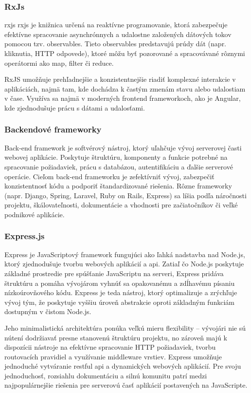 \subsubsection*{RxJs}
\acrshort{rxjs} \acrfull{rxjs} je knižnica určená na reaktívne programovanie, ktorá zabezpečuje efektívne spracovanie asynchrónnych a udalostne založených dátových tokov pomocou tzv. observables. 
Tieto observables predstavujú prúdy dát (napr. kliknutia, HTTP odpovede), ktoré môžu byť pozorované a spracovávané rôznymi operátormi ako map, filter či reduce.

RxJS umožňuje prehľadnejšie a konzistentnejšie riadiť komplexné interakcie v aplikáciách, najmä tam, kde dochádza k častým zmenám stavu alebo udalostiam v čase.
Využíva sa najmä v moderných frontend frameworkoch, ako je Angular, kde zjednodušuje prácu s dátami a udalosťami.\cite{rxjs}
\subsubsection*{Backendové frameworky}
Back-end framework je softvérový nástroj, ktorý uľahčuje vývoj serverovej časti webovej aplikácie. 
Poskytuje štruktúru, komponenty a funkcie potrebné na spracovanie požiadaviek, prácu s databázou, autentifikáciu a ďalšie serverové operácie. 
Cieľom back-end frameworku je zefektívniť vývoj, zabezpečiť konzistentnosť kódu a podporiť štandardizované riešenia. 
Rôzne frameworky (napr. Django, Spring, Laravel, Ruby on Rails, Express) sa líšia podľa náročnosti projektu, škálovateľnosti, dokumentácie a vhodnosti pre začiatočníkov či veľké podnikové aplikácie.\cite{backendframework}

\subsubsection*{Express.js}
Express je JavaScriptový framework fungujúci ako ľahká nadstavba nad Node.js, ktorý zjednodušuje tvorbu webových aplikácií a \acrshort{api}.
Zatiaľ čo Node.js poskytuje základné prostredie pre spúšťanie JavaScriptu na serveri, Express pridáva štruktúru a pomáha vývojárom vyhnúť sa opakovanému a zdĺhavému písaniu nízkoúrovňového kódu. 
Express je teda nástroj, ktorý optimalizuje a zrýchľuje vývoj tým, že poskytuje vyššiu úroveň abstrakcie oproti základným funkciám dostupným v čistom Node.js.

Jeho minimalistická architektúra ponúka veľkú mieru flexibility – vývojári nie sú nútení dodržiavať presne stanovenú štruktúru projektu, no zároveň majú k dispozícii nástroje na efektívne spracovanie HTTP požiadaviek, tvorbu routovacích pravidiel a využívanie middleware vrstiev. 
Express umožňuje jednoduché vytváranie \acrshort{rest}ful \acrshort{api} a dynamických webových aplikácií.
Pre svoju jednoduchosť, rozsiahlu dokumentáciu a silnú komunitu patrí medzi najpopulárnejšie riešenia pre serverovú časť aplikácií postavených na JavaScripte.\cite{express}\cite{backendframework}
